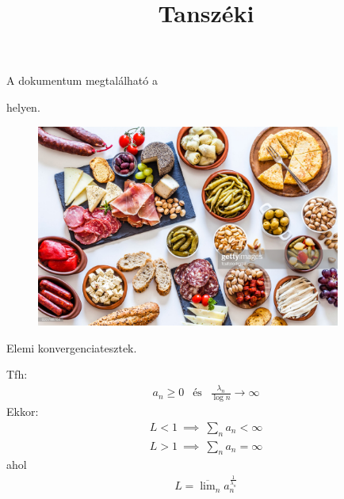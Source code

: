 

\title{Tanszéki}



\begin{frame} \maketitle
\end{frame}


\begin{frame}
A dokumentum megtalálható a 
\vspace{0.3cm}
\vspace{0.3cm}
\par\noindent
helyen.
\end{frame}


\begin{frame}
\begin{figure}%
	\centering
	\includegraphics[width=10cm]{tapas.jpg}
	\label{fig:tapas}
\end{figure}
\end{frame}




\begin{frame} {Elemi konvergenciatesztek.}

\vspace{0.2cm}

\par\noindent Tfh:
\begin{gather*}
a_n\ge 0 \ \ \text{ és } \ \ \frac{\lambda_n}{\log{n}}\to \infty
\end{gather*}
Ekkor:
\begin{gather*}
L<1 \ \implies \ \sum_n a_n< \infty \\
L>1 \ \implies \ \sum_n a_n= \infty
\end{gather*}
ahol
\begin{gather*}
L={\overline{\lim}}_n a_n^{\frac{1}{\lambda_n}}
\end{gather*}

\href{http://bit.ly/3siHgwS}{}

\end{frame}


